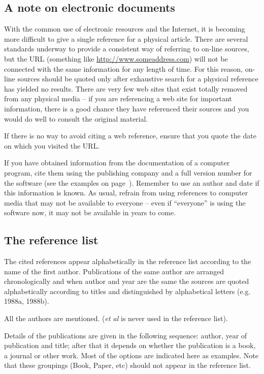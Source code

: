 \documentclass[a5paper, 10pt]{article}
\begin{document}
\subsection{A note on electronic documents}
With the common use of electronic resources and the Internet, it is
becoming more difficult to give a single reference for a physical
article.  There are several standards underway to provide a consistent
way of referring to on-line sources, but the URL (something like
\url{http://www.someaddress.com}) will not be connected with the same
information for any length of time.  For this reason, on-line sources
should be quoted only after exhaustive search for a physical reference
has yielded no results.  There are very few web sites that exist
totally removed from any physical media -- if you are referencing a
web site for important information, there is a good chance they have
referenced their sources and you would do well to consult the original
material.

If there is no way to avoid citing a web reference, ensure that you
quote the date on which you visited the URL.

If you have obtained information from the documentation of a computer
program, cite them using the publishing company and a full version
number for the software (see the examples on
page~\pageref{page:ref_compsoftware}).  Remember to use an author and date
if this information is known.  As usual, refrain from using references
to computer media that may not be available to everyone -- even if
``everyone'' is using the software now, it may not be available in
years to come.

\subsection{The reference list}
\label{sec:referencelist}

The cited references appear alphabetically in the reference list
according to the name of the first author.  Publications of the same
author are arranged chronologically and when author and year are the
same the sources are quoted alphabetically according to titles and
distinguished by alphabetical letters (e.g. 1988a, 1988b).

All the authors are mentioned.  (\emph{et al}  is never used in the
reference list).

Details of the publications are given in the following sequence:
author, year of publication and title; after that it depends on
whether the publication is a book, a journal or other work.  Most of
the options are indicated here as examples.  
Note that these groupings (Book, Paper, etc) should not appear in the reference list.
\end{document}
